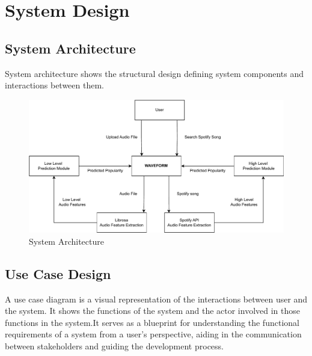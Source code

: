 \documentclass[11pt]{report}
\begin{document}


\chapter{System Design}

\section{System Architecture}
System architecture shows the structural design defining system components and  interactions between them.
\begin{figure}[H]
    \centering
    \includegraphics[scale=.8]{PDF/Sys arch.pdf}
    \caption{System Architecture}
    \label{fig:System Architecture for  Waveform}
\end{figure}

\clearpage
\clearpage

\section{Use Case Design}
A use case diagram is a visual representation of the interactions between user and the system. It shows the functions of the system and the actor involved in those functions in the system.It serves as a blueprint for understanding the functional requirements of a system from a user’s perspective, aiding in the communication between stakeholders and guiding the development process.
\end{document}
